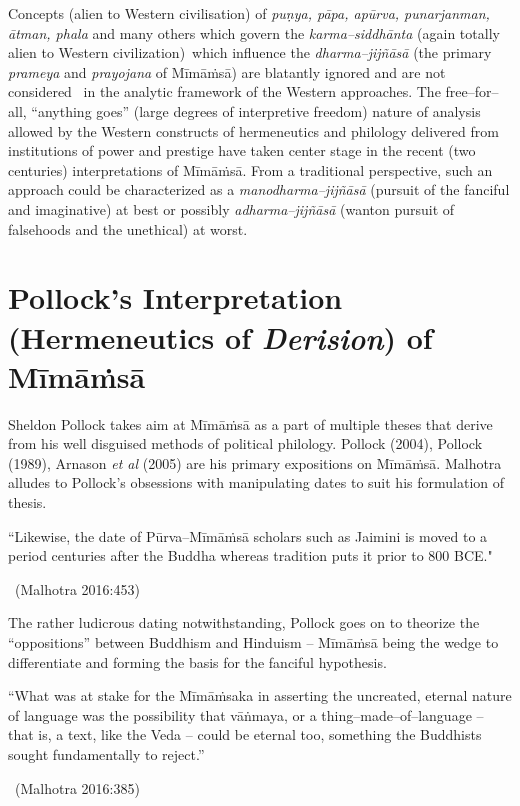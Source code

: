 Concepts (alien to Western civilisation) of \textit{puṇya, pāpa, apūrva, punarjanman, ātman, phala} and many others which govern the \textit{karma–siddhānta} (again totally alien to Western civilization) which influence the \textit{dharma–jijñāsā} (the primary \textit{prameya} and \textit{prayojana} of Mīmāṁsā) are blatantly ignored and are not considered  in the analytic framework of the Western approaches. The free–for–all, “anything goes” (large degrees of interpretive freedom) nature of analysis allowed by the Western constructs of hermeneutics and philology delivered from institutions of power and prestige have taken center stage in the recent (two centuries) interpretations of Mīmāṁsā. From a traditional perspective, such an approach could be characterized as a \textit{manodharma–jijñāsā} (pursuit of the fanciful and imaginative) at best or possibly \textit{adharma–jijñāsā} (wanton pursuit of falsehoods and the unethical) at worst.


\section*{Pollock’s Interpretation (Hermeneutics of \textit{Derision}) of Mīmāṁsā}

Sheldon Pollock takes aim at Mīmāṁsā as a part of multiple theses that derive from his well disguised methods of political philology. Pollock (2004), Pollock (1989), Arnason \textit{et al} (2005) are his primary expositions on Mīmāṁsā. Malhotra alludes to Pollock’s obsessions with manipulating dates to suit his formulation of thesis.

\begin{myquote}
“Likewise, the date of Pūrva–Mīmāṁsā scholars such as Jaimini is moved to a period centuries after the Buddha whereas tradition puts it prior to 800 BCE." 

~\hfill (Malhotra 2016:453)
\end{myquote}

The rather ludicrous dating notwithstanding, Pollock goes on to theorize the “oppositions” between Buddhism and Hinduism – Mīmāṁsā being the wedge to differentiate and forming the basis for the fanciful hypothesis.

\begin{myquote}
“What was at stake for the Mīmāṁsaka in asserting the uncreated, eternal nature of language was the possibility that vāṅmaya, or a thing–made–of–language – that is, a text, like the Veda – could be eternal too, something the Buddhists sought fundamentally to reject.” 

~\hfill (Malhotra 2016:385)
\end{myquote}

